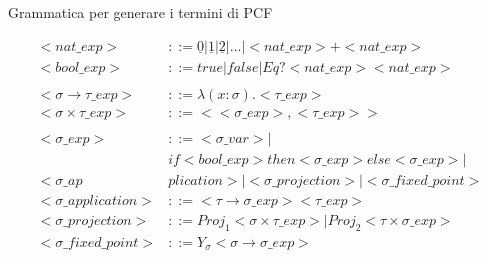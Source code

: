 \documentclass{beamer}
\begin{document}
\begin{frame}
	
	\begin{block}{Grammatica per generare i termini di PCF}
	
	\begin{align*}
		<nat \_exp> &::= \underline{0} | \underline{1} | \underline{2} | \dots | <nat \_exp> + <nat \_exp> \\
		<bool \_exp> &::= true | false | Eq? <nat \_exp> <nat \_exp> \\
		\quad \\
		<\sigma \rightarrow \tau \_ exp> &::= \lambda (x:\sigma) . <\tau \_exp> \\
		<\sigma \times \tau \_exp> &::= <<\sigma \_exp>, <\tau \_ exp>> \\
		\quad \\
		<\sigma \_exp> &::= <\sigma \_var> |\\
		& if <bool \_exp> then <\sigma \_exp> else <\sigma \_exp> | \\
		<\sigma \_ap&plication> | <\sigma \_ projection> | <\sigma \_ fixed\_point> \\
		<\sigma \_application> &::= <\tau \rightarrow \sigma \_exp><\tau \_exp> \\
		<\sigma \_projection> &::= Proj_1<\sigma \times \tau \_exp> | Proj_2<\tau \times \sigma \_exp> \\
		<\sigma \_fixed \_ point> &::= Y_{\sigma} <\sigma \rightarrow \sigma \_exp>
	\end{align*}
	
	\end{block}
	
	
	
\end{frame}
\end{document}
